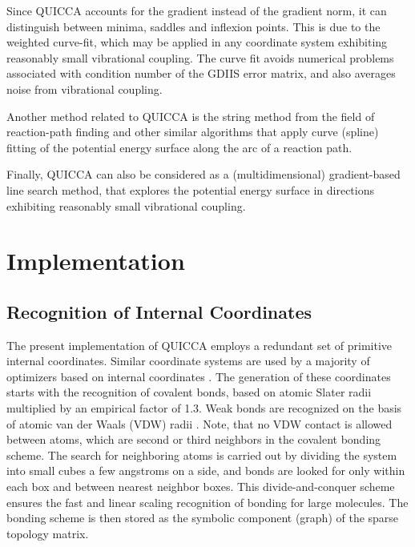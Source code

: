 \documentclass[prl,twocolumn,showpacs,twocolumngrid,superbib]{revtex4}
\begin{document}
Since QUICCA accounts
for the gradient instead of the gradient norm, it can  distinguish between 
minima, saddles and inflexion points.  This is due to the weighted curve-fit, which may  
be applied in any coordinate system exhibiting reasonably small vibrational coupling. 
The curve fit avoids numerical problems associated with condition number
of the GDIIS error matrix, and also averages noise from vibrational coupling.

Another method related to QUICCA is the string method from the
field of reaction-path finding \cite{EWeinan02,BPeters04}
and other similar algorithms \cite{CGonzalez90} that
apply curve (spline) fitting of the potential energy surface 
along the arc of a reaction path. 

Finally, QUICCA can also be considered as a (multidimensional) gradient-based line search method, that explores the potential energy surface in directions
exhibiting reasonably small vibrational coupling.

\section{Implementation}\label{implementation}

\subsection{Recognition of Internal Coordinates} \label{recognition}

The present implementation of QUICCA employs a redundant set of primitive internal 
coordinates. Similar coordinate systems are used by a majority of optimizers based on internal coordinates 
\cite{GFogarasi79,GFogarasi92,FEckert97,JBaker93,HSchlegel98}.  
The generation of these coordinates starts with the recognition of covalent bonds, 
based on atomic Slater radii \cite{JSlater64}  multiplied by an empirical factor of 1.3. 
Weak bonds are recognized on the basis of atomic van der Waals (VDW) radii \cite{webelements}.
Note, that no VDW contact is allowed between atoms, which are second or third neighbors in the 
covalent bonding scheme.  The search for neighboring atoms is carried out by dividing 
the system into small cubes a few angstroms on a side, and bonds are looked for only within 
each box and between nearest neighbor boxes.  This divide-and-conquer scheme ensures the fast 
and linear scaling recognition of bonding for large molecules.   The bonding scheme is then 
stored as the symbolic component (graph) of the sparse topology matrix.
\end{document}
